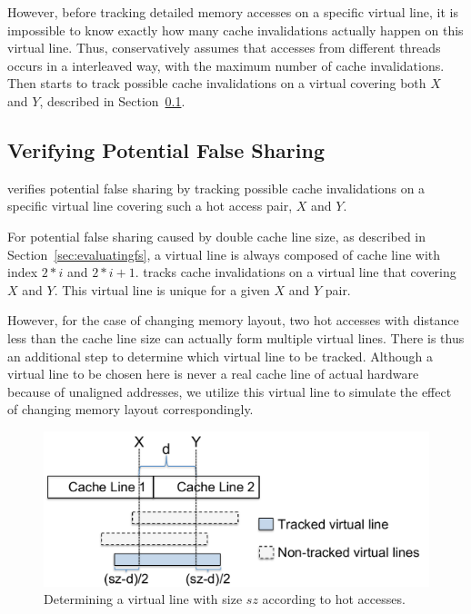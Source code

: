 However, before tracking detailed memory accesses on a specific virtual line, it is impossible to know exactly how many cache invalidations actually happen on this virtual line. Thus, \Predator{} conservatively assumes that accesses from different threads occurs in a interleaved way, with the maximum number of cache invalidations. Then \Predator{} starts to track possible cache invalidations on a virtual covering both $X$ and $Y$, described in Section~\ref{sec:tracking}.  

  

\subsection{Verifying Potential False Sharing}
\label{sec:tracking}

\Predator{} verifies potential false sharing by tracking possible cache invalidations on a specific virtual line covering such a hot access pair, $X$ and $Y$.

For potential false sharing caused by double cache line size, as described in Section~\ref{sec:evaluatingfs}, a virtual line is always composed of cache line with index $2*i$ and $2*i+1$. 
\Predator{} tracks cache invalidations on a virtual line that covering $X$ and $Y$. This virtual line is unique for a given $X$ and $Y$ pair. 

However, for the case of changing memory layout, two hot accesses with distance less than the cache line size 
can actually form multiple virtual lines. 
There is thus an additional step to determine which virtual line to be tracked. 
Although a virtual line to be chosen here is never a real cache line of actual hardware because of unaligned addresses,
we utilize this virtual line to simulate the effect of changing memory layout correspondingly.


\begin{figure}
\begin{center} 
\includegraphics[width=5in]{predator/figure/trackpotential}
\end{center}
\caption{Determining a virtual line with size $sz$ according to hot accesses.}
\label{fig:trackpotential}
\end{figure}


